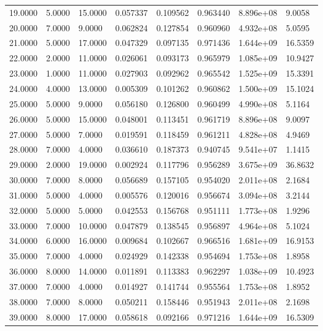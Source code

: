 \documentclass[11pt]{report}
\begin{document}
\begin{longtable}{llllllll}
19.0000 & 5.0000 & 15.0000 & 0.057337 & 0.109562 & 0.963440 & 8.896e+08 & 9.0058 \\
20.0000 & 7.0000 & 9.0000 & 0.062824 & 0.127854 & 0.960960 & 4.932e+08 & 5.0595 \\
21.0000 & 5.0000 & 17.0000 & 0.047329 & 0.097135 & 0.971436 & 1.644e+09 & 16.5359 \\
22.0000 & 2.0000 & 11.0000 & 0.026061 & 0.093173 & 0.965979 & 1.085e+09 & 10.9427 \\
23.0000 & 1.0000 & 11.0000 & 0.027903 & 0.092962 & 0.965542 & 1.525e+09 & 15.3391 \\
24.0000 & 4.0000 & 13.0000 & 0.005309 & 0.101262 & 0.960862 & 1.500e+09 & 15.1024 \\
25.0000 & 5.0000 & 9.0000 & 0.056180 & 0.126800 & 0.960499 & 4.990e+08 & 5.1164 \\
26.0000 & 5.0000 & 15.0000 & 0.048001 & 0.113451 & 0.961719 & 8.896e+08 & 9.0097 \\
27.0000 & 5.0000 & 7.0000 & 0.019591 & 0.118459 & 0.961211 & 4.828e+08 & 4.9469 \\
28.0000 & 7.0000 & 4.0000 & 0.036610 & 0.187373 & 0.940745 & 9.541e+07 & 1.1415 \\
29.0000 & 2.0000 & 19.0000 & 0.002924 & 0.117796 & 0.956289 & 3.675e+09 & 36.8632 \\
30.0000 & 7.0000 & 8.0000 & 0.056689 & 0.157105 & 0.954020 & 2.011e+08 & 2.1684 \\
31.0000 & 5.0000 & 4.0000 & 0.005576 & 0.120016 & 0.956674 & 3.094e+08 & 3.2144 \\
32.0000 & 5.0000 & 5.0000 & 0.042553 & 0.156768 & 0.951111 & 1.773e+08 & 1.9296 \\
33.0000 & 7.0000 & 10.0000 & 0.047879 & 0.138545 & 0.956897 & 4.964e+08 & 5.1024 \\
34.0000 & 6.0000 & 16.0000 & 0.009684 & 0.102667 & 0.966516 & 1.681e+09 & 16.9153 \\
35.0000 & 7.0000 & 4.0000 & 0.024929 & 0.142338 & 0.954694 & 1.753e+08 & 1.8958 \\
36.0000 & 8.0000 & 14.0000 & 0.011891 & 0.113383 & 0.962297 & 1.038e+09 & 10.4923 \\
37.0000 & 7.0000 & 4.0000 & 0.014927 & 0.141744 & 0.955564 & 1.753e+08 & 1.8952 \\
38.0000 & 7.0000 & 8.0000 & 0.050211 & 0.158446 & 0.951943 & 2.011e+08 & 2.1698 \\
39.0000 & 8.0000 & 17.0000 & 0.058618 & 0.092166 & 0.971216 & 1.644e+09 & 16.5309 \\

\end{longtable}
\end{document}
